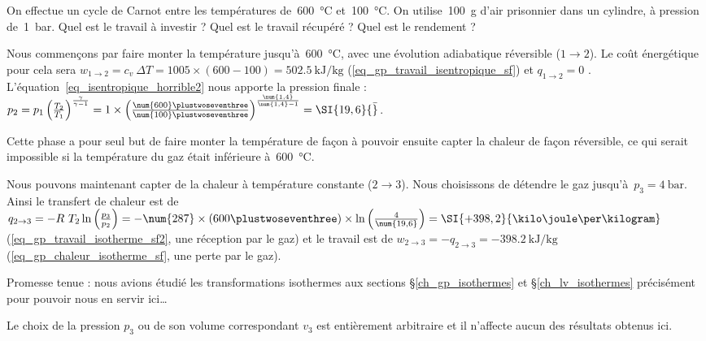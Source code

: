 		\onlyamphibook{\clearpage}%
		\begin{anexample}
		\label{ex_cycle_carnot}
			On effectue un cycle de Carnot entre les températures de~\SI{600}{\degreeCelsius} et~\SI{100}{\degreeCelsius}. On utilise~\SI{100}{\gram} d’air prisonnier dans un cylindre, à pression de~\SI{1}{\bar}. Quel est le travail à investir ? Quel est le travail récupéré ? Quel est le rendement ?
				 \begin{answer}
				 	Nous commençons par faire monter la température jusqu’à~\SI{600}{\degreeCelsius}, avec une évolution adiabatique réversible ($1\to 2$). Le coût énergétique pour cela sera $w_{1\to 2} = c_v \ \Delta T = \num{1005}\times(\num{600}-\num{100}) = \SI{+502,5}{\kilo\joule\per\kilogram}$ (\ref{eq_gp_travail_isentropique_sf}) et $q_{1\to 2} = 0$ . L’équation~\ref{eq_isentropique_horrible2} nous apporte la pression finale : $p_2
				 	= p_1 \left(\frac{T_2}{T_1}\right)^{\frac{\gamma}{\gamma - 1}}
				 	= 1 \times \left(\frac{\num{600}\plustwoseventhree}{\num{100}\plustwoseventhree}\right)^{\frac{\num{1,4}}{\num{1,4} - 1}}
				 	= \SI{19,6}{\bar}$.
				 		\begin{remark}Cette phase a pour seul but de faire monter la température de façon à pouvoir ensuite capter la chaleur de façon réversible, ce qui serait impossible si la température du gaz était inférieure à~\SI{600}{\degreeCelsius}.\end{remark}
					Nous pouvons maintenant capter de la chaleur à température constante ($2 \to 3$). Nous choisissons de détendre le gaz jusqu’à~$p_3 = \SI{4}{\bar}$. Ainsi le transfert de chaleur est de $q_{2 \to 3}
					= - R \ T_2 \ln\left(\frac{p_3}{p_2}\right)
					= - \num{287} \times (600\plustwoseventhree) \times \ln \left(\frac{4}{\num{19,6}}\right)
					= \SI{+398,2}{\kilo\joule\per\kilogram}$ (\ref{eq_gp_travail_isotherme_sf2}, une réception par le gaz) et le travail est de $w_{2 \to 3} = - q_{2 \to 3} = \SI{-398,2}{\kilo\joule\per\kilogram}$ (\ref{eq_gp_chaleur_isotherme_sf}, une perte par le gaz).
						\begin{remark}Promesse tenue : nous avions étudié les transformations isothermes aux sections \S\ref{ch_gp_isothermes} et \S\ref{ch_lv_isothermes} précisément pour pouvoir nous en servir ici…\end{remark}
				 		\begin{remark}Le choix de la pression $p_3$ ou de son volume correspondant $v_3$ est entièrement arbitraire et il n’affecte aucun des résultats obtenus ici.\end{remark}

\end{answer}
\end{anexample}

